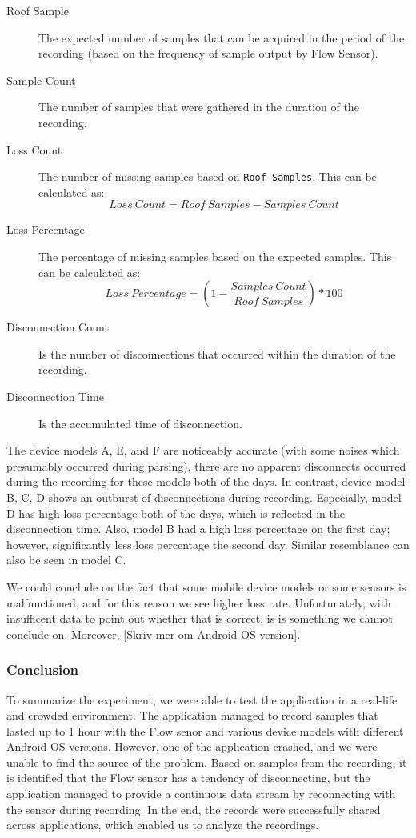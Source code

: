 \begin{description}
    \item[Roof Sample] The expected number of samples that can be acquired in the period of the recording (based on the frequency of sample output by Flow Sensor).
    \item[Sample Count] The number of samples that were gathered in the duration of the recording. 
    \item[Loss Count] The number of missing samples based on \verb|Roof Samples|. This can be calculated as: 
\begin{equation} \label{losscount}
Loss\ Count = Roof\ Samples - Samples\ Count
\end{equation}
    \item[Loss Percentage] The percentage of missing samples based on the expected samples. This can be calculated as:
\begin{equation} \label{losscount}
Loss\ Percentage = (1 - \frac{Samples\ Count}{Roof\ Samples}) * 100
\end{equation}
    \item[Disconnection Count] Is the number of disconnections that occurred within the duration of the recording.
    \item[Disconnection Time] Is the accumulated time of disconnection. 
\end{description}

The device models A, E, and F are noticeably accurate (with some noises which presumably occurred during parsing), there are no apparent disconnects occurred during the recording for these models both of the days. In contrast, device model B, C, D shows an outburst of disconnections during recording. Especially, model D has high loss percentage both of the days, which is reflected in the disconnection time. Also, model B had a high loss percentage on the first day; however, significantly less loss percentage the second day. Similar resemblance can also be seen in model C.

We could conclude on the fact that some mobile device models or some sensors is malfunctioned, and for this reason we see higher loss rate. Unfortunately, with insufficent data to point out whether that is correct, is is something we cannot conclude on. Moreover, [Skriv mer om Android OS version].

\subsubsection{Conclusion}
To summarize the experiment, we were able to test the application in a real-life and crowded environment. The application managed to record samples that lasted up to 1 hour with the Flow senor and various device models with different Android OS versions. However, one of the application crashed, and we were unable to find the source of the problem. Based on samples from the recording, it is identified that the Flow sensor has a tendency of disconnecting, but the application managed to provide a continuous data stream by reconnecting with the sensor during recording. In the end, the records were successfully shared across applications, which enabled us to analyze the recordings.  

